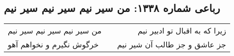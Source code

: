 \begin{center}
\section*{رباعی شماره ۱۳۳۸: من سیر نیم سیر نیم سیر نیم}
\label{sec:1338}
\begin{longtable}{l p{0.5cm} r}
من سیر نیم سیر نیم سیر نیم
&&
زیرا که به اقبال تو ادبیر نیم
\\
خرگوش نگیرم و نخواهم آهو
&&
جز عاشق و جز طالب آن شیر نیم
\\
\end{longtable}
\end{center}
